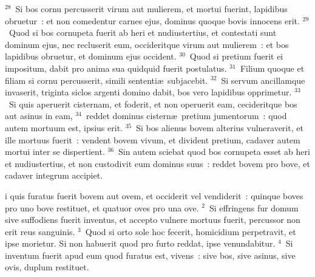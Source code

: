 ${}^{28}$~Si bos cornu percusserit virum aut mulierem, et mortui fuerint, lapidibus obruetur~: et non comedentur carnes ejus, dominus quoque bovis innocens erit.
${}^{29}$~Quod si bos cornupeta fuerit ab heri et nudiustertius, et contestati sunt dominum ejus, nec recluserit eum, occideritque virum aut mulierem~: et bos lapidibus obruetur, et dominum ejus occident.
${}^{30}$~Quod si pretium fuerit ei impositum, dabit pro anima sua quidquid fuerit postulatus.
${}^{31}$~Filium quoque et filiam si cornu percusserit, simili sententi\ae\ subjacebit.
${}^{32}$~Si servum ancillamque invaserit, triginta siclos argenti domino dabit, bos vero lapidibus opprimetur.
${}^{33}$~Si quis aperuerit cisternam, et foderit, et non operuerit eam, cecideritque bos aut asinus in eam,
${}^{34}$~reddet dominus cistern\ae\ pretium jumentorum~: quod autem mortuum est, ipsius erit.
${}^{35}$~Si bos alienus bovem alterius vulneraverit, et ille mortuus fuerit~: vendent bovem vivum, et divident pretium, cadaver autem mortui inter se dispertient.
${}^{36}$~Sin autem sciebat quod bos cornupeta esset ab heri et nudiustertius, et non custodivit eum dominus suus~: reddet bovem pro bove, et cadaver integrum accipiet.

\bchapter
{}i quis furatus fuerit bovem aut ovem, et occiderit vel vendiderit~: quinque boves pro uno bove restituet, et quatuor oves pro una ove.
${}^{2}$~Si effringens fur domum sive suffodiens fuerit inventus, et accepto vulnere mortuus fuerit, percussor non erit reus sanguinis.
${}^{3}$~Quod si orto sole hoc fecerit, homicidium perpetravit, et ipse morietur. Si non habuerit quod pro furto reddat, ipse venundabitur.
${}^{4}$~Si inventum fuerit apud eum quod furatus est, vivens~: sive bos, sive asinus, sive ovis, duplum restituet.


